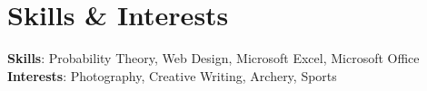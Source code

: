 \documentclass[letterpaper,11pt]{article}
\begin{document}
\section{Skills \& Interests}
\begin{itemize}[leftmargin=0.15in, label={}]
    \small{
    \item{
        \vspace{1mm}
        \textbf{Skills}{: Probability Theory, Web Design, Microsoft Excel, Microsoft Office} \\
        \vspace{1mm}
        \textbf{Interests}{: Photography, Creative Writing, Archery, Sports} \\
        \vspace{1mm}

    }}
\end{itemize}
\end{document}
